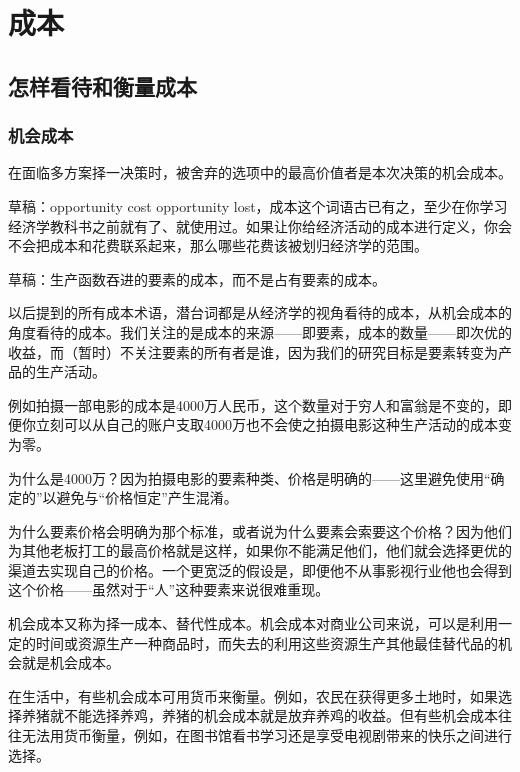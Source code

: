 \chapter{成本}
\label{chp:cost}

\section{怎样看待和衡量成本}

\subsection{机会成本}

\begin{Definition}[机会成本]
在面临多方案择一决策时，被舍弃的选项中的最高价值者是本次决策的机会成本。
\end{Definition}

草稿：opportunity cost opportunity lost，成本这个词语古已有之，至少在你学习经济学教科书之前就有了、就使用过。如果让你给经济活动的成本进行定义，你会不会把成本和花费联系起来，那么哪些花费该被划归经济学的范围。

草稿：生产函数吞进的要素的成本，而不是占有要素的成本。

以后提到的所有成本术语，潜台词都是从经济学的视角看待的成本，从机会成本的角度看待的成本。我们关注的是成本的来源——即要素，成本的数量——即次优的收益，而（暂时）不关注要素的所有者是谁，因为我们的研究目标是要素转变为产品的生产活动。

例如拍摄一部电影的成本是4000万人民币，这个数量对于穷人和富翁是不变的，即便你立刻可以从自己的账户支取4000万也不会使之拍摄电影这种生产活动的成本变为零。

为什么是4000万？因为拍摄电影的要素种类、价格是明确的——这里避免使用“确定的”以避免与“价格恒定”产生混淆。

为什么要素价格会明确为那个标准，或者说为什么要素会索要这个价格？因为他们为其他老板打工的最高价格就是这样，如果你不能满足他们，他们就会选择更优的渠道去实现自己的价格。一个更宽泛的假设是，即便他不从事影视行业他也会得到这个价格——虽然对于“人”这种要素来说很难重现。

机会成本又称为择一成本、替代性成本。机会成本对商业公司来说，可以是利用一定的时间或资源生产一种商品时，而失去的利用这些资源生产其他最佳替代品的机会就是机会成本。

在生活中，有些机会成本可用货币来衡量。例如，农民在获得更多土地时，如果选择养猪就不能选择养鸡，养猪的机会成本就是放弃养鸡的收益。但有些机会成本往往无法用货币衡量，例如，在图书馆看书学习还是享受电视剧带来的快乐之间进行选择。

